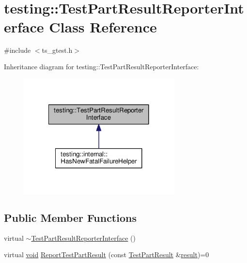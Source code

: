 \hypertarget{classtesting_1_1TestPartResultReporterInterface}{\section{testing\-:\-:Test\-Part\-Result\-Reporter\-Interface Class Reference}
\label{classtesting_1_1TestPartResultReporterInterface}
}


{\ttfamily \#include $<$ts\-\_\-gtest.\-h$>$}



Inheritance diagram for testing\-:\-:Test\-Part\-Result\-Reporter\-Interface\-:\nopagebreak
\begin{figure}[H]
\begin{center}
\leavevmode
\includegraphics[width=234pt]{classtesting_1_1TestPartResultReporterInterface__inherit__graph}
\end{center}
\end{figure}
\subsection*{Public Member Functions}
\begin{DoxyCompactItemize}
\item 
virtual \hyperlink{classtesting_1_1TestPartResultReporterInterface_a338b51591ed654f84dc0feaaf2b66917}{$\sim$\-Test\-Part\-Result\-Reporter\-Interface} ()
\item 
virtual \hyperlink{legacy_8hpp_a8bb47f092d473522721002c86c13b94e}{void} \hyperlink{classtesting_1_1TestPartResultReporterInterface_aa2f920e7a5a0a6d0faf19e3727928c22}{Report\-Test\-Part\-Result} (const \hyperlink{classtesting_1_1TestPartResult}{Test\-Part\-Result} \&\hyperlink{legacy_8hpp_a0bb77d54f6769867cfdf389897bd8e43}{result})=0
\end{DoxyCompactItemize}


